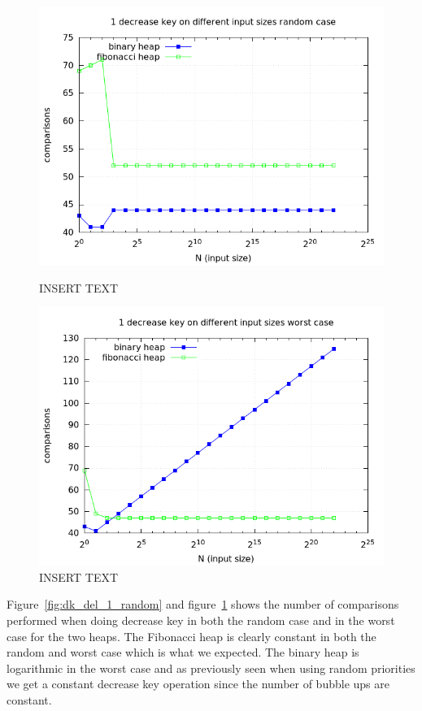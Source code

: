 \documentclass[a4paper,oneside,article,11pt]{memoir}
\begin{document}
\begin{figure}[H]
\centering
\begin{minipage}{0.48\columnwidth}
  \centering
  \includegraphics[width=\linewidth]{../res/dk/dk_random_fixed_size_1.png}%
  \caption{INSERT TEXT}
  \label{fig:dk_del_1_random}
\end{minipage}%
\hfill
\begin{minipage}{0.48\columnwidth}
  \centering
  \includegraphics[width=\linewidth]{../res/dk/dk_worst_fixed_size_1.png}%
  \caption{INSERT TEXT}
  \label{fig:dk_del_1_worst}
\end{minipage}
\end{figure}

Figure~\ref{fig:dk_del_1_random} and figure~\ref{fig:dk_del_1_worst} shows the number of comparisons performed when doing decrease key in both the random case and in the worst case for the two heaps. The Fibonacci heap is clearly constant in both the random and worst case which is what we expected. The binary heap is logarithmic in the worst case and as previously seen when using random priorities we get a constant decrease key operation since the number of bubble ups are constant.
\end{document}
